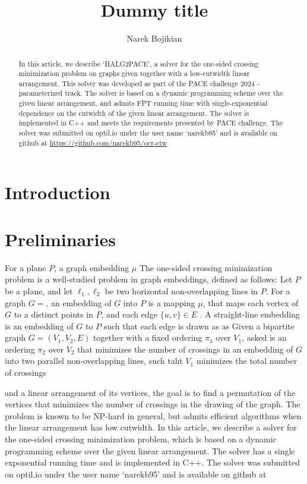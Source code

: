 \documentclass[a4paper,UKenglish,cleveref, autoref, thm-restate]{lipics-v2021}
\title{Dummy title} %
\author{Narek Bojikian}{Humboldt University of Berlin, Germany}{bojikian@informatik.hu-berlin.de}{[todo]}{}%
\begin{document}
\maketitle

\begin{abstract}
    In this article, we describe `HALG2PACE', a solver for the one-sided crossing minimization problem on graphs given together with a low-cutwidth linear arrangement. 
    This solver was developed as part of the PACE challenge 2024 - parameterized track. The solver is based on a dynamic programming scheme over the given linear arrangement, and admits FPT running time with single-exponential dependence on the cutwidth of the given linear arrangement. The solver is implemented in C++ and meets the requirements presented by PACE challenge. The solver was submitted on optil.io under the user name `narekb95' and is available on github at \url{https://github.com/narekb95/ocr-ctw}
\end{abstract}
\section{Introduction}

\section{Preliminaries}
For a plane $P$, a graph embedding $\mu$
The one-sided crossing minimization problem is a well-studied problem in graph embeddings, defined as follows: Let $P$ be a plane, and let $\ell_1, \ell_2$ be two horizontal non-overlapping lines in $P$. For a graph $G=$, an embedding of $G$ into $P$ is a mapping $\mu$, that maps each vertex of $G$ to a distinct points in $P$, and each edge $\{u,v\}\in E$  . A straight-line embedding is an embedding of $G$ to $P$ such that each edge is drawn as as 
Given a bipartite graph $G = (V_1,V_2,E)$ together with a fixed ordering $\pi_1$ over $V_1$, asked is an ordering $\pi_2$ over $V_2$ that minimizes the number of crossings in an embedding of $G$ into two parallel non-overlapping lines, such taht $V_1$  minimizes the total number of crossings 

and a linear arrangement of its vertices, the goal is to find a permutation of the vertices that minimizes the number of crossings in the drawing of the graph. The problem is known to be NP-hard in general, but admits efficient algorithms when the linear arrangement has low cutwidth. In this article, we describe a solver for the one-sided crossing minimization problem, which is based on a dynamic programming scheme over the given linear arrangement. The solver has a single exponential running time and is implemented in C++. The solver was submitted on optil.io under the user name `narekb95' and is available on github at 
\end{document}
